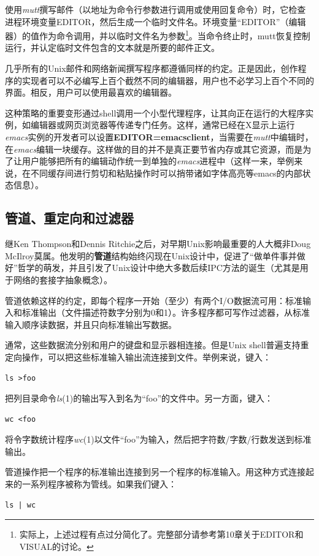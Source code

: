 \documentclass[12pt,oneside]{book}
\begin{document}
使用\textit{mutt}撰写邮件（以地址为命令行参数进行调用或使用回复命令）时，它检查进程环境变量EDITOR，然后生成一个临时文件名。环境变量“EDITOR”（编辑器）的值作为命令调用，并以临时文件名为参数\footnote{实际上，上述过程有点过分简化了。完整部分请参考第10章关于EDITOR和VISUAL的讨论。}。当命令终止时，mutt恢复控制运行，并认定临时文件包含的文本就是所要的邮件正文。

几乎所有的Unix邮件和网络新闻撰写程序都遵循同样的约定。正是因此，创作程序的实现者可以不必编写上百个截然不同的编辑器，用户也不必学习上百个不同的界面。相反，用户可以使用最喜欢的编辑器。

这种策略的重要变形通过shell调用一个小型代理程序，让其向正在运行的大程序实例，如编辑器或网页浏览器等传递专门任务。这样，通常已经在X显示上运行\textit{emacs}实例的开发者可以设置\textbf{EDITOR=emacsclient}，当需要在\textit{mutt}中编辑时，在\textit{emacs}编辑一块缓存。这样做的目的并不是真正要节省内存或其它资源，而是为了让用户能够把所有的编辑动作统一到单独的\textit{emacs}进程中（这样一来，举例来说，在不同缓存间进行剪切和粘贴操作时可以捎带诸如字体高亮等emacs的内部状态信息）。

\subsection{管道、重定向和过滤器}
继Ken Thompson和Dennis Ritchie之后，对早期Unix影响最重要的人大概非Doug McIlroy莫属。他发明的\textbf{管道}结构始终闪现在Unix设计中，促进了“做单件事并做好”哲学的萌发，并且引发了Unix设计中绝大多数后续IPC方法的诞生（尤其是用于网络的套接字抽象概念）。

管道依赖这样的约定，即每个程序一开始（至少）有两个I/O数据流可用：标准输入和标准输出（文件描述符数字分别为0和1）。许多程序都可写作过滤器，从标准输入顺序读数据，并且只向标准输出写数据。

通常，这些数据流分别和用户的键盘和显示器相连接。但是Unix shell普遍支持重定向操作，可以把这些标准输入输出流连接到文件。举例来说，键入：
\begin{Verbatim}
ls >foo
\end{Verbatim}


把列目录命令\textit{ls}(1)的输出写入到名为“foo”的文件中。另一方面，键入：
\begin{Verbatim}
wc <foo
\end{Verbatim}


将令字数统计程序\textit{wc}(1)以文件“foo”为输入，然后把字符数/字数/行数发送到标准输出。

管道操作把一个程序的标准输出连接到另一个程序的标准输入。用这种方式连接起来的一系列程序被称为管线。如果我们键入：
\begin{Verbatim}
ls | wc
\end{Verbatim}
\end{document}
